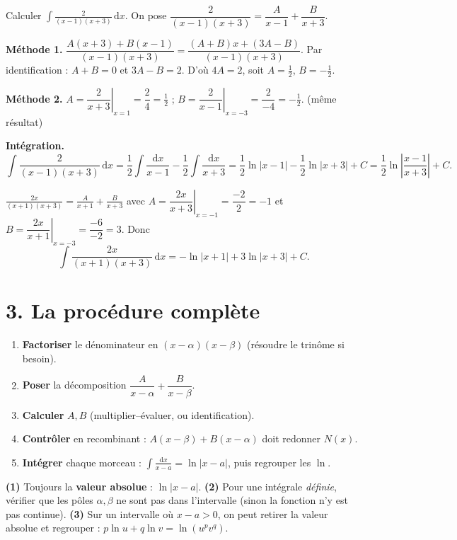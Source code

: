 \documentclass[11pt,a4paper]{article}
\newcommand{\dd}{\mathrm{d}}
\begin{document}
\begin{exemple}
Calculer $\displaystyle\int\frac{2}{(x-1)(x+3)}\,\dd x$. On pose
$\dfrac{2}{(x-1)(x+3)}=\dfrac{A}{x-1}+\dfrac{B}{x+3}$.

\smallskip
\textbf{Méthode 1.} $\dfrac{A(x+3)+B(x-1)}{(x-1)(x+3)}=\dfrac{(A+B)x+(3A-B)}{(x-1)(x+3)}$.
Par identification : $A+B=0$ et $3A-B=2$. D'où $4A=2$, soit $A=\tfrac12$, $B=-\tfrac12$.

\smallskip
\textbf{Méthode 2.} $A=\left.\dfrac{2}{x+3}\right|_{x=1}=\dfrac24=\tfrac12$ ;\quad
$B=\left.\dfrac{2}{x-1}\right|_{x=-3}=\dfrac{2}{-4}=-\tfrac12$. \checkmark (même résultat)

\smallskip
\textbf{Intégration.}
\[
\int\frac{2}{(x-1)(x+3)}\,\dd x=\frac12\int\frac{\dd x}{x-1}-\frac12\int\frac{\dd x}{x+3}
=\frac12\ln|x-1|-\frac12\ln|x+3|+C=\frac12\ln\left|\frac{x-1}{x+3}\right|+C.
\]
\end{exemple}

\begin{exemple}
$\displaystyle\frac{2x}{(x+1)(x+3)}=\frac{A}{x+1}+\frac{B}{x+3}$ avec
$A=\left.\dfrac{2x}{x+3}\right|_{x=-1}=\dfrac{-2}{2}=-1$ et
$B=\left.\dfrac{2x}{x+1}\right|_{x=-3}=\dfrac{-6}{-2}=3$. Donc
\[
\int\frac{2x}{(x+1)(x+3)}\,\dd x=-\ln|x+1|+3\ln|x+3|+C.
\]
\end{exemple}

\section*{3. La procédure complète}

\begin{methode}
\begin{enumerate}[leftmargin=1.8em,topsep=2pt,itemsep=1pt]
  \item \textbf{Factoriser} le dénominateur en $(x-\alpha)(x-\beta)$ (résoudre le trinôme si besoin).
  \item \textbf{Poser} la décomposition $\dfrac{A}{x-\alpha}+\dfrac{B}{x-\beta}$.
  \item \textbf{Calculer} $A,B$ (multiplier–évaluer, ou identification).
  \item \textbf{Contrôler} en recombinant : $A(x-\beta)+B(x-\alpha)$ doit redonner $N(x)$.
  \item \textbf{Intégrer} chaque morceau : $\int\frac{\dd x}{x-a}=\ln|x-a|$, puis regrouper les $\ln$.
\end{enumerate}
\end{methode}

\begin{attention}
\textbf{(1)} Toujours la \textbf{valeur absolue} : $\ln|x-a|$. \textbf{(2)} Pour une intégrale
\emph{définie}, vérifier que les pôles $\alpha,\beta$ ne sont pas dans l'intervalle (sinon la
fonction n'y est pas continue). \textbf{(3)} Sur un intervalle où $x-a>0$, on peut retirer la valeur
absolue et regrouper : $p\ln u+q\ln v=\ln(u^{p}v^{q})$.
\end{attention}
\end{document}
